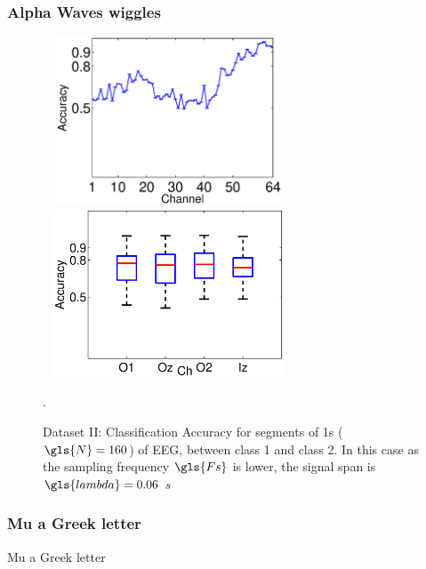 \documentclass[aspectratio=169]{beamer}
\begin{document}
\begin{frame}
\frametitle{Alpha Waves wiggles}
\begin{figure}[h!]
\centering
\includegraphics[width=7.5cm, height=5cm]{images/DatasetPhysionetAccuracyPerChannel}
\includegraphics[width=7.5cm, height=5cm]{images/DatasetPhysionetBoxPlots}
\caption[PhysioNet Dataset Binary Classification Accuracy]{Dataset II: Classification Accuracy for segments of 1s ($\gls{N} = 160$) of EEG, between class 1 and class 2.  In this case as the sampling frequency $\gls{Fs}$ is lower, the signal span is $\gls{lambda} = 0.06$   $\si{s}$}.
\label{fig:alpharesultsdatasetii}
\end{figure}
\end{frame}

\begin{frame}
\frametitle{Mu a Greek letter}
\begin{center}
\LARGE Mu a Greek letter
\end{center}
\end{frame}
\end{document}
